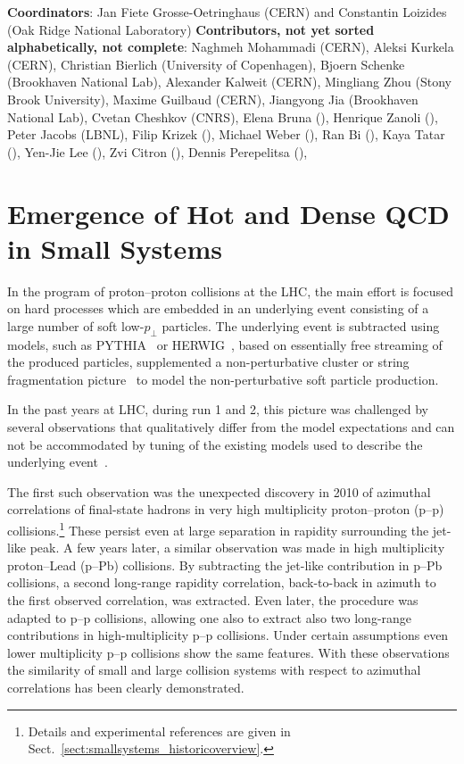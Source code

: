 \documentclass[../report.tex]{subfiles}
\begin{document}
\textbf{Coordinators}: Jan Fiete Grosse-Oetringhaus (CERN) and Constantin Loizides (Oak Ridge National Laboratory) 
\linebreak
\textbf{Contributors, not yet sorted alphabetically, not complete}:
Naghmeh Mohammadi (CERN), 
Aleksi Kurkela (CERN), 
Christian Bierlich (University of Copenhagen), 
Bjoern Schenke (Brookhaven National Lab), 
Alexander Kalweit (CERN),
Mingliang Zhou (Stony Brook University),
Maxime Guilbaud (CERN),
Jiangyong Jia (Brookhaven National Lab), 
Cvetan Cheshkov (CNRS),
Elena Bruna (),
Henrique Zanoli (),
Peter Jacobs (LBNL),
Filip Krizek (),
Michael Weber (),
Ran Bi (),
Kaya Tatar (),
Yen-Jie Lee (),
Zvi Citron (),
Dennis Perepelitsa (),

\label{sec:smallsyst}
\section{Emergence of Hot and Dense QCD in Small Systems}
\label{sect:introduction}
In the program of proton--proton collisions at the LHC, the main effort is focused on hard processes which are embedded in an underlying event consisting of a large number of soft low-$p_\perp$ particles. The underlying event is subtracted using models, such as PYTHIA~\cite{Sjostrand:2014zea} or HERWIG~\cite{Bellm:2015jjp}, based on essentially free streaming of the produced particles, supplemented a non-perturbative cluster or string fragmentation picture~\cite{Andersson:1983ia,Webber:1983if} to model the non-perturbative soft particle production.  

In the past years at LHC, during run 1 and 2, this picture was challenged by several observations that qualitatively differ from the model expectations and can not be accommodated by tuning of the existing models used to describe the underlying event~\cite{Fischer:2016zzs}.

The first such observation was the unexpected discovery in 2010 of azimuthal correlations of final-state hadrons in very high multiplicity proton--proton (p--p) collisions.\footnote{Details and experimental references are given in Sect.~\ref{sect:smallsystems_historicoverview}.} These persist even at large separation in rapidity surrounding the jet-like peak. A few years later, a similar observation was made in high multiplicity proton--Lead (p--Pb) collisions. By subtracting the jet-like contribution in p--Pb collisions, a second long-range rapidity correlation, back-to-back in azimuth to the first observed correlation, was extracted. Even later, the procedure was adapted to p--p collisions, allowing one also to extract also two long-range contributions in high-multiplicity p--p collisions. Under certain assumptions even lower multiplicity p--p collisions show the same features. With these observations the similarity of small and large collision systems with respect to azimuthal correlations has been clearly demonstrated.
\end{document}
